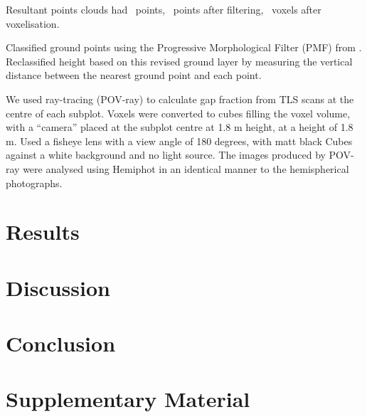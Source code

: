 \documentclass[11pt,a4paper]{article}
\newcommand{\beginsupplement}{%
	\setcounter{table}{0}
	\renewcommand{\thetable}{S\arabic{table}}%
	\setcounter{figure}{0}
	\renewcommand{\thefigure}{S\arabic{figure}}%
}
\begin{document}
Resultant points clouds had ~points, ~points after filtering, ~voxels after
voxelisation.

Classified ground points using the Progressive Morphological Filter (PMF) from
\citep{Zhang2003}. Reclassified height based on this revised ground layer by
measuring the vertical distance between the nearest ground point and each point.

We used ray-tracing (POV-ray) to calculate gap fraction from TLS scans at the
centre of each subplot. Voxels were converted to cubes filling the voxel volume,
with a ``camera'' placed at the subplot centre at 1.8 m height, at a height of
1.8 m. Used a fisheye lens with a view angle of 180 degrees, with matt black
Cubes against a white background and no light source. The images produced by
POV-ray were analysed using Hemiphot in an identical manner to the hemispherical
photographs.

\section{Results}

\section{Discussion}

\section{Conclusion}

\printbibliography

\section{Supplementary Material} \beginsupplement
\end{document}

